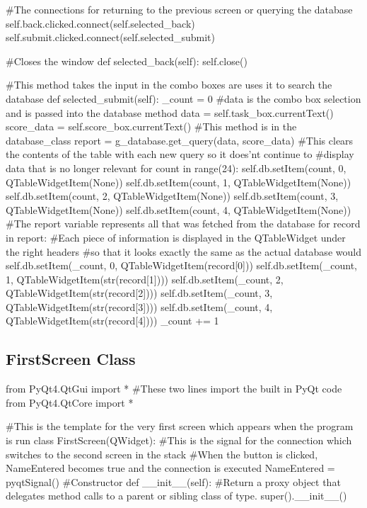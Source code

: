 \begin{landscape}
\begin{python}
        #The connections for returning to the previous screen or querying the database
        self.back.clicked.connect(self.selected_back)
        self.submit.clicked.connect(self.selected_submit)

    #Closes the window
    def selected_back(self):
        self.close()

    #This method takes the input in the combo boxes are uses it to search the database
    def selected_submit(self):
        _count = 0
        #data is the combo box selection and is passed into the database method
        data = self.task_box.currentText()
        score_data = self.score_box.currentText()
        #This method is in the database_class
        report = g_database.get_query(data, score_data)
        #This clears the contents of the table with each new query so it does'nt continue to
        #display data that is no longer relevant
        for count in range(24):
            self.db.setItem(count, 0, QTableWidgetItem(None))
            self.db.setItem(count, 1, QTableWidgetItem(None))
            self.db.setItem(count, 2, QTableWidgetItem(None))
            self.db.setItem(count, 3, QTableWidgetItem(None))
            self.db.setItem(count, 4, QTableWidgetItem(None))
        #The report variable represents all that was fetched from the database
        for record in report:
            #Each piece of information is displayed in the QTableWidget under the right headers
            #so that it looks exactly the same as the actual database would
            self.db.setItem(_count, 0, QTableWidgetItem(record[0]))
            self.db.setItem(_count, 1, QTableWidgetItem(str(record[1])))
            self.db.setItem(_count, 2, QTableWidgetItem(str(record[2])))
            self.db.setItem(_count, 3, QTableWidgetItem(str(record[3])))
            self.db.setItem(_count, 4, QTableWidgetItem(str(record[4])))
            _count += 1
\end{python}

\subsection{FirstScreen Class}

\begin{python}
from PyQt4.QtGui import * #These two lines import the built in PyQt code
from PyQt4.QtCore import *

#This is the template for the very first screen which appears when the program is run
class FirstScreen(QWidget):
    #This is the signal for the connection which switches to the second screen in the stack
    #When the button is clicked, NameEntered becomes true and the connection is executed
    NameEntered = pyqtSignal()
    #Constructor
    def __init__(self):
        #Return a proxy object that delegates method calls to a parent or sibling class of type.
        super().__init__()


\end{python}
\end{landscape}
